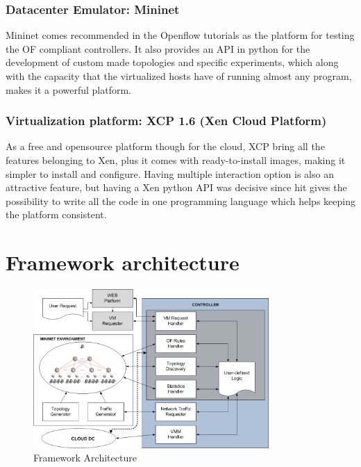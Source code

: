 \documentclass[12pt,english,oneside]{book}
\begin{document}
\subsubsection{Datacenter Emulator: Mininet}
\hspace{0.6cm}

Mininet comes recommended in the Openflow tutorials as the platform for testing the OF compliant controllers.
It also provides an API in python for the development of custom made topologies and specific experiments, which along with the capacity that the virtualized hosts have of running almost any program, makes it a powerful platform.

\subsubsection{Virtualization platform: XCP 1.6 (Xen Cloud Platform)}
\hspace{0.6cm}

As a free and opensource platform though for the cloud, XCP bring all the features belonging to Xen, plus it comes with ready-to-install images, making it simpler to install and configure.
Having multiple interaction option is also an attractive feature, but having a Xen python API was decisive since hit gives the possibility to write all the code in one programming language which helps keeping the platform consistent.
\newpage

\section{Framework architecture}
\hspace{0.6cm}

\begin{figure}[htbp]
        \centering
        \includegraphics[width=0.8\textwidth]{figures/emulator_new.png}
        \caption{Framework Architecture}
        \label{fig:framework}
\end{figure}
\end{document}
